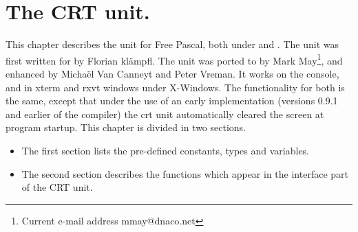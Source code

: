 %
%
%
%
%
\chapter{The CRT unit.}
\label{ch:crtunit}

This chapter describes the  unit for Free Pascal, both under \dos
\linux and \windows. The unit was first written for \dos by Florian kl\"ampfl. 
The unit was ported to \linux by Mark May\footnote{Current
e-mail address \textsf{mmay@dnaco.net}}, and enhanced by Micha\"el Van Canneyt
and Peter Vreman. It works on the \linux console, and in xterm and rxvt windows
under X-Windows. The functionality for both is the same, except that under
\linux the use of an early implementation (versions 0.9.1 and earlier of the
compiler) the crt unit automatically cleared the screen at program startup.
This chapter is divided in two sections. 
\begin{itemize}
\item The first section lists the pre-defined constants, types and variables. 
\item The second section describes the functions which appear in the
interface part of the CRT unit.
\end{itemize}
